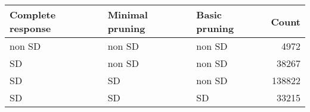 \begin{tabular}{lllr}
\toprule
Complete response & Minimal pruning & Basic pruning &  Count \\
\midrule
           non SD &          non SD &        non SD &   4972 \\
               SD &          non SD &        non SD &  38267 \\
               SD &              SD &        non SD & 138822 \\
               SD &              SD &            SD &  33215 \\
\bottomrule
\end{tabular}
